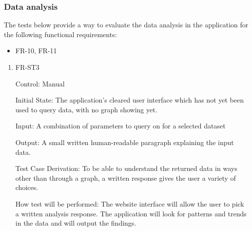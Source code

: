 \documentclass[12pt, titlepage]{article}
\begin{document}
\subsubsection{Data analysis}
    The tests below provide a way to evaluate the data analysis in the
    application for the following functional requirements:
    \begin{itemize}
      \item FR-10, FR-11
    \end{itemize}
      \begin{enumerate}
      
        \item{FR-ST3}
        
        Control: Manual
                  
        Initial State: The application's cleared user interface which has not
        yet been used to query data, with no graph showing yet.
                  
        Input: A combination of parameters to query on for a selected dataset
                  
        Output: A small written human-readable paragraph explaining the input
        data.
       
        Test Case Derivation: To be able to understand the returned data in ways
        other than through a graph, a written response gives the user a variety
        of choices.
                 
        How test will be performed: The website interface will allow the user to
        pick a written analysis response. The application will look for patterns
        and trends in the data and will output the findings. 
        
        \end{enumerate}
\end{document}

